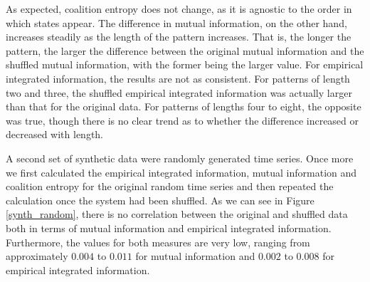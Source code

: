 \documentclass[a4paper,11pt]{article}
\begin{document}
As expected, coalition entropy does not change, as it is agnostic to the order in which states appear. The difference in mutual information, on the other hand, increases steadily as the length of the pattern increases. That is, the longer the pattern, the larger the difference between the original mutual information and the shuffled mutual information, with the former being the larger value. For empirical integrated information, the results are not as consistent. For patterns of length two and three, the shuffled empirical integrated information was actually larger than that for the original data. For patterns of lengths four to eight, the opposite was true, though there is no clear trend as to whether the difference increased or decreased with length.

A second set of synthetic data were randomly generated time series. Once more we first calculated the empirical integrated information, mutual information and coalition entropy for the original random time series and then repeated the calculation once the system had been shuffled. As we can see in Figure \ref{synth_random}, there is no correlation between the original and shuffled data both in terms of mutual information and empirical integrated information. Furthermore, the values for both measures are very low, ranging from approximately $0.004$ to $0.011$ for mutual information and $0.002$ to $0.008$ for empirical integrated information. 
\end{document}
